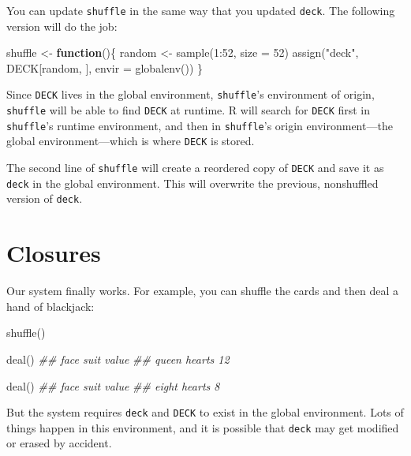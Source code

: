 \documentclass[
  letterpaper,
  DIV=11,
  numbers=noendperiod]{scrbook}
\newenvironment{Shaded}{\begin{snugshade}}{\end{snugshade}}
\newcommand{\AttributeTok}[1]{\textcolor[rgb]{0.40,0.45,0.13}{#1}}
\newcommand{\ControlFlowTok}[1]{\textcolor[rgb]{0.00,0.23,0.31}{\textbf{#1}}}
\newcommand{\DecValTok}[1]{\textcolor[rgb]{0.68,0.00,0.00}{#1}}
\newcommand{\DocumentationTok}[1]{\textcolor[rgb]{0.37,0.37,0.37}{\textit{#1}}}
\newcommand{\FunctionTok}[1]{\textcolor[rgb]{0.28,0.35,0.67}{#1}}
\newcommand{\NormalTok}[1]{\textcolor[rgb]{0.00,0.23,0.31}{#1}}
\newcommand{\OtherTok}[1]{\textcolor[rgb]{0.00,0.23,0.31}{#1}}
\newcommand{\SpecialCharTok}[1]{\textcolor[rgb]{0.37,0.37,0.37}{#1}}
\newcommand{\StringTok}[1]{\textcolor[rgb]{0.13,0.47,0.30}{#1}}
\begin{document}
You can update \texttt{shuffle} in the same way that you updated
\texttt{deck}. The following version will do the job:

\begin{Shaded}
\begin{Highlighting}[]
\NormalTok{shuffle }\OtherTok{\textless{}{-}} \ControlFlowTok{function}\NormalTok{()\{}
\NormalTok{  random }\OtherTok{\textless{}{-}} \FunctionTok{sample}\NormalTok{(}\DecValTok{1}\SpecialCharTok{:}\DecValTok{52}\NormalTok{, }\AttributeTok{size =} \DecValTok{52}\NormalTok{)}
  \FunctionTok{assign}\NormalTok{(}\StringTok{"deck"}\NormalTok{, DECK[random, ], }\AttributeTok{envir =} \FunctionTok{globalenv}\NormalTok{())}
\NormalTok{\}}
\end{Highlighting}
\end{Shaded}

Since \texttt{DECK} lives in the global environment, \texttt{shuffle}'s
environment of origin, \texttt{shuffle} will be able to find
\texttt{DECK} at runtime. R will search for \texttt{DECK} first in
\texttt{shuffle}'s runtime environment, and then in \texttt{shuffle}'s
origin environment---the global environment---which is where
\texttt{DECK} is stored.

The second line of \texttt{shuffle} will create a reordered copy of
\texttt{DECK} and save it as \texttt{deck} in the global environment.
This will overwrite the previous, nonshuffled version of \texttt{deck}.

\section{Closures}\label{closures}

Our system finally works. For example, you can shuffle the cards and
then deal a hand of blackjack:

\begin{Shaded}
\begin{Highlighting}[]
\FunctionTok{shuffle}\NormalTok{()}

\FunctionTok{deal}\NormalTok{()}
\DocumentationTok{\#\#  face   suit value}
\DocumentationTok{\#\# queen hearts    12}

\FunctionTok{deal}\NormalTok{()}
\DocumentationTok{\#\#  face   suit value}
\DocumentationTok{\#\# eight hearts     8}
\end{Highlighting}
\end{Shaded}

But the system requires \texttt{deck} and \texttt{DECK} to exist in the
global environment. Lots of things happen in this environment, and it is
possible that \texttt{deck} may get modified or erased by accident.
\end{document}

